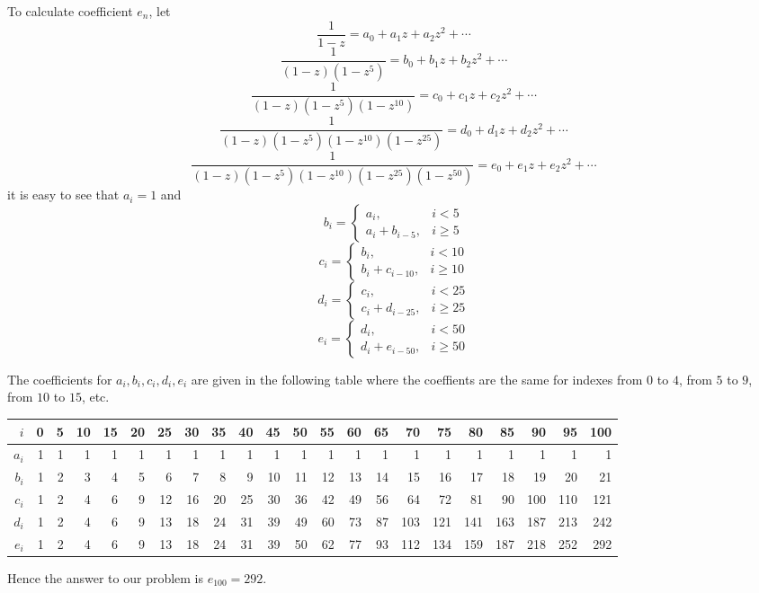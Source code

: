 To calculate coefficient $e_n$, let
\[
  \frac{1}{1-z} = a_0 + a_1 z + a_2 z^2 + \cdots
\]
\[
  \frac{1}{(1-z)(1-z^5)} = b_0 + b_1 z + b_2 z^2 + \cdots
\]
\[
  \frac{1}{(1-z)(1-z^5)(1-z^{10})} = c_0 + c_1 z + c_2 z^2 + \cdots
\]
\[
  \frac{1}{(1-z)(1-z^5)(1-z^{10})(1-z^{25})} = d_0 + d_1 z + d_2 z^2 + \cdots
\]
\[
  \frac{1}{(1-z)(1-z^5)(1-z^{10})(1-z^{25})(1-z^{50})} 
     = e_0 + e_1 z + e_2 z^2 + \cdots
\]
it is easy to see that $a_i=1$ and
\[
  b_i = 
    \begin{cases}
      a_i,             & i<5  \\
      a_i + b_{i-5},   & i\ge 5  
    \end{cases}
\]
\[
  c_i = 
    \begin{cases}
      b_i,              & i<10  \\
      b_i + c_{i-10},   & i\ge 10  
    \end{cases}
\]
\[
  d_i = 
    \begin{cases}
      c_i,              & i<25  \\
      c_i + d_{i-25},   & i\ge 25  
    \end{cases}
\]
\[
  e_i = 
    \begin{cases}
      d_i,              & i<50  \\
      d_i + e_{i-50},   & i\ge 50  
    \end{cases}
\]

The coefficients for $a_i,b_i,c_i,d_i,e_i$ are given in the following table
where the coeffients are the same for indexes from $0$ to $4$, from $5$ to
$9$, from $10$ to $15$, etc.
\begin{table*}
\begin{tabular}{r|r|r|r|r|r|r|r|r|r|r|r|r|r|r|r|r|r|r|r|r|r}
\hline\hline
$i$   & 0 & 5 &10 &15 &20 & 25 & 30 & 35 & 40 & 45 & 50 & 55 & 60 & 65 &  70 &  75 &  80 &  85 &  90 &  95 & 100 \\
\hline
$a_i$ & 1 & 1 & 1 & 1 & 1 &  1 &  1 &  1 &  1 &  1 &  1 &  1 &  1 &  1 &   1 &   1 &   1 &   1 &   1 &   1 &   1 \\
$b_i$ & 1 & 2 & 3 & 4 & 5 &  6 &  7 &  8 &  9 & 10 & 11 & 12 & 13 & 14 &  15 &  16 &  17 &  18 &  19 &  20 &  21 \\
$c_i$ & 1 & 2 & 4 & 6 & 9 & 12 & 16 & 20 & 25 & 30 & 36 & 42 & 49 & 56 &  64 &  72 &  81 &  90 & 100 & 110 & 121 \\
$d_i$ & 1 & 2 & 4 & 6 & 9 & 13 & 18 & 24 & 31 & 39 & 49 & 60 & 73 & 87 & 103 & 121 & 141 & 163 & 187 & 213 & 242 \\
$e_i$ & 1 & 2 & 4 & 6 & 9 & 13 & 18 & 24 & 31 & 39 & 50 & 62 & 77 & 93 & 112 & 134 & 159 & 187 & 218 & 252 & 292 \\
\hline
\end{tabular}
\end{table*}

Hence the answer to our problem is $e_{100}=292$.
